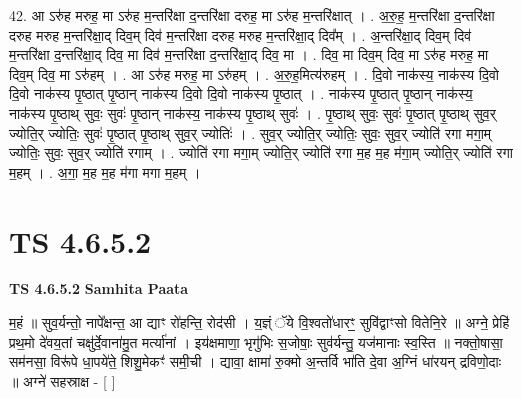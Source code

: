 \documentclass[17pt]{extarticle}
\begin{document}
42. आ ऽरु॑ह मरुह॒ मा ऽरु॑ह म॒न्तरि॑क्षा द॒न्तरि॑क्षा दरुह॒ मा ऽरु॑ह म॒न्तरि॑क्षात् । . अ॒रु॒ह॒ म॒न्तरि॑क्षा द॒न्तरि॑क्षा दरुह मरुह म॒न्तरि॑क्षा॒द् दिव॒म् दिव॑ म॒न्तरि॑क्षा दरुह मरुह म॒न्तरि॑क्षा॒द् दिव᳚म् । . अ॒न्तरि॑क्षा॒द् दिव॒म् दिव॑ म॒न्तरि॑क्षा द॒न्तरि॑क्षा॒द् दिव॒ मा दिव॑ म॒न्तरि॑क्षा द॒न्तरि॑क्षा॒द् दिव॒ मा । . दिव॒ मा दिव॒म् दिव॒ मा ऽरु॑ह मरुह॒ मा दिव॒म् दिव॒ मा ऽरु॑हम् । . आ ऽरु॑ह मरुह॒ मा ऽरु॑हम् । . अ॒रु॒ह॒मित्य॑रुहम् । . दि॒वो नाक॑स्य॒ नाक॑स्य दि॒वो दि॒वो नाक॑स्य पृ॒ष्ठात् पृ॒ष्ठान् नाक॑स्य दि॒वो दि॒वो नाक॑स्य पृ॒ष्ठात् । . नाक॑स्य पृ॒ष्ठात् पृ॒ष्ठान् नाक॑स्य॒ नाक॑स्य पृ॒ष्ठाथ् सुवः॒ सुवः॑ पृ॒ष्ठान् नाक॑स्य॒ नाक॑स्य पृ॒ष्ठाथ् सुवः॑ । . पृ॒ष्ठाथ् सुवः॒ सुवः॑ पृ॒ष्ठात् पृ॒ष्ठाथ् सुव॒र् ज्योति॒र् ज्योतिः॒ सुवः॑ पृ॒ष्ठात् पृ॒ष्ठाथ् सुव॒र् ज्योतिः॑ । . सुव॒र् ज्योति॒र् ज्योतिः॒ सुवः॒ सुव॒र् ज्योति॑ रगा मगा॒म् ज्योतिः॒ सुवः॒ सुव॒र् ज्योति॑ रगाम् । . ज्योति॑ रगा मगा॒म् ज्योति॒र् ज्योति॑ रगा म॒ह म॒ह म॑गा॒म् ज्योति॒र् ज्योति॑ रगा म॒हम् । . अ॒गा॒ म॒ह म॒ह म॑गा मगा म॒हम् । \newline
\pagebreak
{}

\section{ TS 4.6.5.2 }

\textbf{TS 4.6.5.2 } \newline
\textbf{Samhita Paata} \newline

म॒हं ॥ सुव॒र्यन्तो॒ नापे᳚क्षन्त॒ आ द्याꣳ रो॑हन्ति॒ रोद॑सी । य॒ज्ञ्ं ॅये वि॒श्वतो॑धारꣳ॒॒ सुवि॑द्वाꣳसो वितेनि॒रे ॥ अग्ने॒ प्रेहि॑ प्रथ॒मो दे॑वय॒तां चक्षु॑र्दे॒वाना॑मु॒त मर्त्या॑नां । इय॑क्षमाणा॒ भृगु॑भिः स॒जोषाः॒ सुव॑र्यन्तु॒ यज॑मानाः स्व॒स्ति ॥ नक्तो॒षासा॒ सम॑नसा॒ विरू॑पे धा॒पये॑ते॒ शिशु॒मेकꣳ॑ समी॒ची । द्यावा॒ क्षामा॑ रु॒क्मो अ॒न्तर्वि भा॑ति दे॒वा अ॒ग्निं धा॑रयन् द्रविणो॒दाः ॥ अग्ने॑ सहस्राक्ष - [  ] \newline
\end{document}
